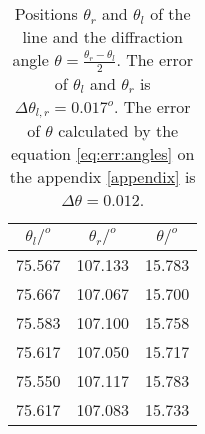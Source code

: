 \begin{table}[H]
	\centering
	\begin{tabular}{ c  c  c }
		\\\hline
		\centering
			$\theta_{l}/^o$ & $\theta_{r}/^o$ & $\theta/^o$ \\\hline
			75.567 & 107.133 & 15.783 \\
			75.667 & 107.067 & 15.700 \\
			75.583 & 107.100 & 15.758 \\
			75.617 & 107.050 & 15.717 \\
			75.550 & 107.117 & 15.783 \\
			75.617 & 107.083 & 15.733 \\\hline
	\end{tabular}
	\caption{\label{Tab:dParameter}Positions $\theta_r$ and $\theta_l$ of the \cl line and the diffraction angle $\theta = \frac{\theta_r-\theta_l}{2}$. The error of $\theta_l$ and $\theta_r$ is $\Delta \theta_{l,r} = 0.017^o$. The error of $\theta$ calculated by the equation \ref{eq:err:angles} on the appendix \ref{appendix} is $\Delta \theta = 0.012$.}
\end{table}
